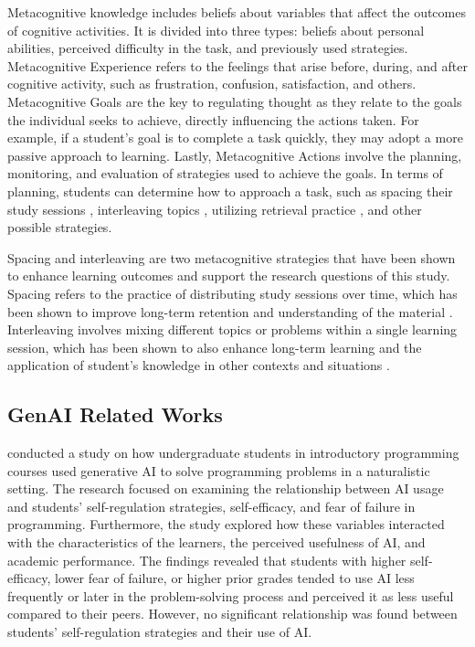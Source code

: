 \documentclass[a4paper,twoside]{article}
\begin{document}
Metacognitive knowledge includes beliefs about variables that affect the
outcomes of cognitive activities. It is divided into three types: beliefs about
personal abilities, perceived difficulty in the task, and previously used
strategies. Metacognitive Experience refers to the feelings that arise before,
during, and after cognitive activity, such as frustration, confusion,
satisfaction, and others. Metacognitive Goals are the key to regulating thought
as they relate to the goals the individual seeks to achieve, directly
influencing the actions taken. For example, if a student’s goal is to complete
a task quickly, they may adopt a more passive approach to learning. Lastly,
Metacognitive Actions involve the planning, monitoring, and evaluation of
strategies used to achieve the goals. In terms of planning, students can
determine how to approach a task, such as spacing their study sessions
\citep{Ouhao18, Carvalho20}, interleaving topics \citep{Rivers21}, utilizing
retrieval practice \citep{larsen18}, and other possible strategies.

Spacing and interleaving are two metacognitive strategies that have been shown
to enhance learning outcomes and support the research questions of this study.
Spacing refers to the practice of distributing study sessions over time, which
has been shown to improve long-term retention and understanding of the material
\citep{Carvalho20}. Interleaving involves mixing different topics or problems
within a single learning session, which has been shown to also enhance long-term
learning and the application of student's knowledge in other contexts and
situations \citep{Rivers21}.

\subsection{GenAI Related Works}

\cite{Margulieux24} conducted a study on how undergraduate students in
introductory programming courses used generative AI to solve programming
problems in a naturalistic setting. The research focused on examining the
relationship between AI usage and students’ self-regulation strategies,
self-efficacy, and fear of failure in programming. Furthermore, the study
explored how these variables interacted with the characteristics of the learners,
the perceived usefulness of AI, and academic performance. The findings revealed
that students with higher self-efficacy, lower fear of failure, or higher prior
grades tended to use AI less frequently or later in the problem-solving process
and perceived it as less useful compared to their peers. However, no significant
relationship was found between students’ self-regulation strategies and their
use of AI.
\end{document}
